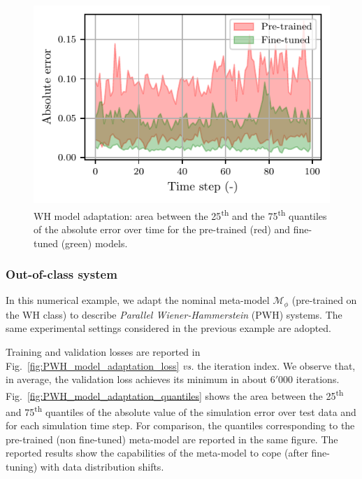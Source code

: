 \documentclass{ifacconf}
\newcommand{\free}{\mathcal{M}}
\begin{document}
\begin{figure}[t]
\centering
\includegraphics[width=.8\linewidth]{img/adaptation/wh_error_25_75_percentile.pdf}
\caption{WH model adaptation: area between the 25\textsuperscript{th} and the 75\textsuperscript{th} quantiles of the absolute error over time for the pre-trained (red) and fine-tuned (green) models. }
\label{fig:WH_model_adaptation_quantiles}   
\end{figure}

\subsubsection{Out-of-class system}
In this numerical example, we adapt the nominal meta-model $\free_\phi$ (pre-trained on the WH class) to describe \emph{Parallel Wiener-Hammerstein} (PWH) systems. The same experimental settings considered in the previous example are adopted. 

Training and validation losses are reported in Fig.~\ref{fig:PWH_model_adaptation_loss} \emph{vs.} the iteration index. We observe that, in average, the validation loss achieves its minimum in about $6'000$ iterations. Fig.~\ref{fig:PWH_model_adaptation_quantiles}  shows the area between the 25\textsuperscript{th} and 75\textsuperscript{th} quantiles of the absolute value of the simulation error over test data and for each simulation time step. For comparison, the  quantiles corresponding to the pre-trained (non fine-tuned) meta-model are reported in the same figure. The reported results show the capabilities of the meta-model to cope  (after fine-tuning) with data distribution shifts. 
\end{document}
